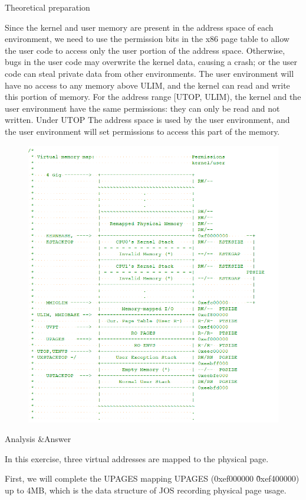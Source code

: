 \begin{flushleft}
{\Large Theoretical preparation}
\end{flushleft}

Since the kernel and user memory are present in the address space of each environment, we need to use the permission bits in the x86 page table to allow the user code to access only the user portion of the address space. Otherwise, bugs in the user code may overwrite the kernel data, causing a crash; or the user code can steal private data from other environments.
The user environment will have no access to any memory above ULIM, and the kernel can read and write this portion of memory. For the address range [UTOP, ULIM), the kernel and the user environment have the same permissions: they can only be read and not written. Under UTOP
The address space is used by the user environment, and the user environment will set permissions to access this part of the memory.
\begin{figure}[H]
\centering
\includegraphics[width=0.8\linewidth]{figure/mem_layout}
\end{figure}

\begin{flushleft}
{\Large Analysis \&Answer}
\end{flushleft}

In this exercise, three virtual addresses are mapped to the physical page.

First, we will complete the UPAGES mapping UPAGES (0xef000000 \~ 0xef400000) up to 4MB, which is the data structure of JOS recording physical page usage.

